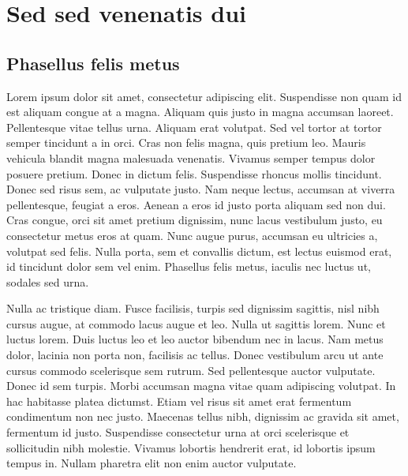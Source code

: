 \documentclass{EPUProjetDi}
\begin{document}
\chapter{Sed sed venenatis dui}

\section{Phasellus felis metus}

Lorem ipsum dolor sit amet, consectetur adipiscing elit. Suspendisse non quam id est aliquam congue at a magna. Aliquam quis justo in magna accumsan laoreet. Pellentesque vitae tellus urna. Aliquam erat volutpat. Sed vel tortor at tortor semper tincidunt a in orci. Cras non felis magna, quis pretium leo. Mauris vehicula blandit magna malesuada venenatis. Vivamus semper tempus dolor posuere pretium. Donec in dictum felis. Suspendisse rhoncus mollis tincidunt. Donec sed risus sem, ac vulputate justo. Nam neque lectus, accumsan at viverra pellentesque, feugiat a eros. Aenean a eros id justo porta aliquam sed non dui. Cras congue, orci sit amet pretium dignissim, nunc lacus vestibulum justo, eu consectetur metus eros at quam. Nunc augue purus, accumsan eu ultricies a, volutpat sed felis. Nulla porta, sem et convallis dictum, est lectus euismod erat, id tincidunt dolor sem vel enim. Phasellus felis metus, iaculis nec luctus ut, sodales sed urna.

Nulla ac tristique diam. Fusce facilisis, turpis sed dignissim sagittis, nisl nibh cursus augue, at commodo lacus augue et leo. Nulla ut sagittis lorem. Nunc et luctus lorem. Duis luctus leo et leo auctor bibendum nec in lacus. Nam metus dolor, lacinia non porta non, facilisis ac tellus. Donec vestibulum arcu ut ante cursus commodo scelerisque sem rutrum. Sed pellentesque auctor vulputate. Donec id sem turpis. Morbi accumsan magna vitae quam adipiscing volutpat. In hac habitasse platea dictumst. Etiam vel risus sit amet erat fermentum condimentum non nec justo. Maecenas tellus nibh, dignissim ac gravida sit amet, fermentum id justo. Suspendisse consectetur urna at orci scelerisque et sollicitudin nibh molestie. Vivamus lobortis hendrerit erat, id lobortis ipsum tempus in. Nullam pharetra elit non enim auctor vulputate.
\end{document}
